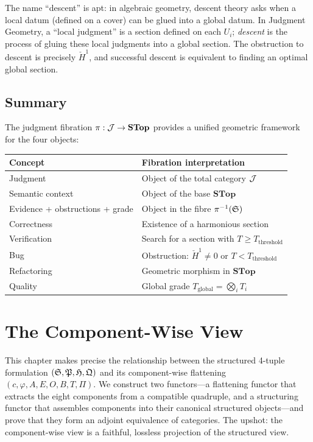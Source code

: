 \begin{remark}[Descent = gluing sections]
The name ``descent'' is apt: in algebraic geometry, descent theory asks
when a local datum (defined on a cover) can be glued into a global
datum.  In Judgment Geometry, a ``local judgment'' is a section defined
on each $U_i$; \emph{descent} is the process of gluing these local
judgments into a global section.  The obstruction to descent is precisely
$\check{H}^1$, and successful descent is equivalent to finding an
optimal global section.
\end{remark}

\section{Summary}

The judgment fibration $\pi : \mathcal{J} \to \mathbf{STop}$ provides a
unified geometric framework for the four objects:

\begin{center}
\renewcommand{\arraystretch}{1.3}
\begin{tabular}{@{}ll@{}}
\textbf{Concept} & \textbf{Fibration interpretation} \\
\hline
Judgment & Object of the total category $\mathcal{J}$ \\
Semantic context & Object of the base $\mathbf{STop}$ \\
Evidence + obstructions + grade & Object in the fibre $\pi^{-1}(\mathfrak{S})$ \\
Correctness & Existence of a harmonious section \\
Verification & Search for a section with $T \geq T_{\mathrm{threshold}}$ \\
Bug & Obstruction: $\check{H}^1 \neq 0$ or $T < T_{\mathrm{threshold}}$ \\
Refactoring & Geometric morphism in $\mathbf{STop}$ \\
Quality & Global grade $T_{\mathrm{global}} = \bigotimes_i T_i$
\end{tabular}
\end{center}

\chapter{The Component-Wise View}
\label{ch:equivalence}

This chapter makes precise the relationship between the structured
4-tuple formulation $(\mathfrak{S}, \mathfrak{P}, \mathfrak{H}, \mathfrak{Q})$ and its
component-wise flattening $(c, \varphi, A, E, O, B, T, \Pi)$.
We construct two functors---a
flattening functor that extracts the eight components from a compatible
quadruple, and a structuring functor that assembles components into their
canonical structured objects---and prove that they form an adjoint
equivalence of categories.  The upshot: the component-wise view is a
faithful, lossless projection of the structured view.

